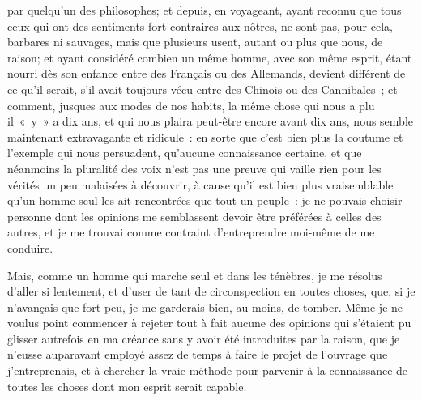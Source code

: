 \documentclass[french,twoside]{book} %
\begin{document}
par quelqu'un des philosophes; et depuis, en voyageant, ayant reconnu que tous ceux qui ont des sentiments fort contraires aux nôtres, ne sont pas, pour cela, barbares ni sauvages, mais que plusieurs usent, autant ou plus que nous, de raison; et ayant considéré combien un même homme, avec son même esprit, étant nourri dès son enfance entre des Français ou des Allemands, devient différent de ce qu'il serait, s'il avait toujours vécu entre des Chinois ou des Cannibales ; et comment, jusques aux modes de nos habits, la même chose qui nous a plu il « y » a dix ans, et qui nous plaira peut-être encore avant dix ans, nous semble maintenant extravagante et ridicule : en sorte que c'est bien plus la coutume et l'exemple qui nous persuadent, qu'aucune connaissance certaine, et que néanmoins la pluralité des voix n'est pas une preuve qui vaille rien pour les vérités un peu malaisées à découvrir, à cause qu'il est bien plus vraisemblable qu'un homme seul les ait rencontrées que tout un peuple : je ne pouvais choisir personne dont les opinions me semblassent devoir être préférées à celles des autres, et je me trouvai comme contraint d'entreprendre moi-même de me conduire.\par
Mais, comme un homme qui marche seul et dans les ténèbres, je me résolus d'aller si lentement, et d'user de tant de circonspection en toutes choses, que, si je n'avançais que fort peu, je me garderais bien, au moins, de tomber. Même je ne voulus point commencer à rejeter tout à fait aucune des opinions qui s'étaient pu glisser autrefois en ma créance sans y avoir été introduites par la raison, que je n'eusse auparavant employé assez de temps à faire le projet de l'ouvrage que j'entreprenais, et à chercher la vraie méthode pour parvenir à la connaissance de toutes les choses dont mon esprit serait capable.\par
\end{document}
